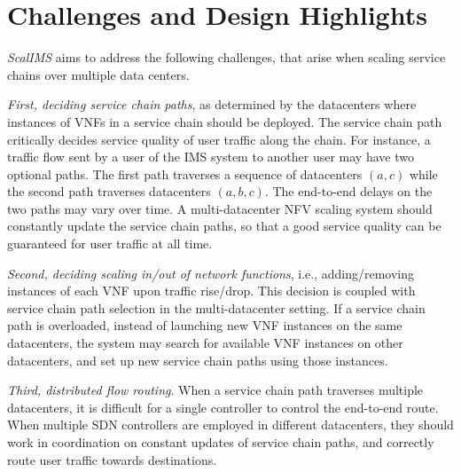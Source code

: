 \section{Challenges and Design Highlights}

\textit{ScalIMS} aims to address the following challenges, that arise when scaling service chains over multiple data centers.

{\em First, deciding service chain paths}, as determined by the datacenters where instances of VNFs in a service chain should be deployed. The service chain path critically decides service quality of user traffic along the chain.
For instance, a traffic flow sent by a user of the IMS system to another user may have two optional paths. The first path traverses a sequence of datacenters $(a, c)$ while the second path traverses datacenters $(a, b, c)$. %
The end-to-end delays on the two paths may vary over time. A multi-datacenter NFV scaling system should constantly update the service chain paths, so that a good service quality can be guaranteed for user traffic at all time.


{\em Second, deciding scaling in/out of network functions}, i.e., adding/removing instances of each VNF upon traffic rise/drop. This decision is coupled with service chain path selection in the multi-datacenter setting. If a service chain path is  overloaded, instead of launching new VNF instances on the same datacenters, the system may search for available VNF instances on other datacenters, and set up new service chain paths using those instances. %

{\em Third, distributed flow routing}. %
When a service chain path traverses multiple datacenters, it is difficult for a single controller to control the end-to-end route. %
 When multiple SDN controllers are employed in different datacenters, they should work in coordination on constant updates of service chain paths, and correctly route user traffic towards destinations.

